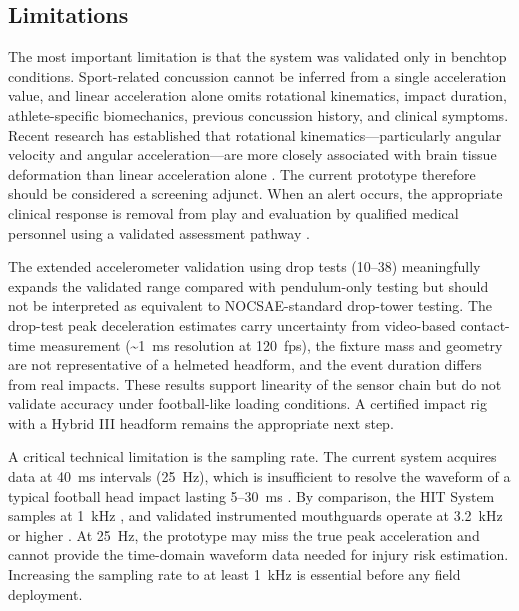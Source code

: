 \documentclass[11pt]{article}
\begin{document}
\subsection{Limitations}
The most important limitation is that the system was validated only in benchtop conditions. Sport-related concussion cannot be inferred from a single acceleration value, and linear acceleration alone omits rotational kinematics, impact duration, athlete-specific biomechanics, previous concussion history, and clinical symptoms. Recent research has established that rotational kinematics---particularly angular velocity and angular acceleration---are more closely associated with brain tissue deformation than linear acceleration alone \citep{cecchi2023rotational,rowson2013brain}. The current prototype therefore should be considered a screening adjunct. When an alert occurs, the appropriate clinical response is removal from play and evaluation by qualified medical personnel using a validated assessment pathway \citep{patricios2023consensus,echemendia2023scat6}.

The extended accelerometer validation using drop tests (\SI{10}{}--\SI{38}{\gee}) meaningfully expands the validated range compared with pendulum-only testing but should not be interpreted as equivalent to NOCSAE-standard drop-tower testing. The drop-test peak deceleration estimates carry uncertainty from video-based contact-time measurement (\textasciitilde{}\SI{1}{ms} resolution at 120~fps), the fixture mass and geometry are not representative of a helmeted headform, and the event duration differs from real impacts. These results support linearity of the sensor chain but do not validate accuracy under football-like loading conditions. A certified impact rig with a Hybrid III headform remains the appropriate next step.

A critical technical limitation is the sampling rate. The current system acquires data at \SI{40}{ms} intervals (\SI{25}{Hz}), which is insufficient to resolve the waveform of a typical football head impact lasting \SI{5}{}--\SI{30}{ms} \citep{guskiewicz2007measurement,pellman2003location}. By comparison, the HIT System samples at \SI{1}{kHz} \citep{king2017systematic}, and validated instrumented mouthguards operate at \SI{3.2}{kHz} or higher \citep{gabler2020onfield}. At \SI{25}{Hz}, the prototype may miss the true peak acceleration and cannot provide the time-domain waveform data needed for injury risk estimation. Increasing the sampling rate to at least \SI{1}{kHz} is essential before any field deployment.
\end{document}
